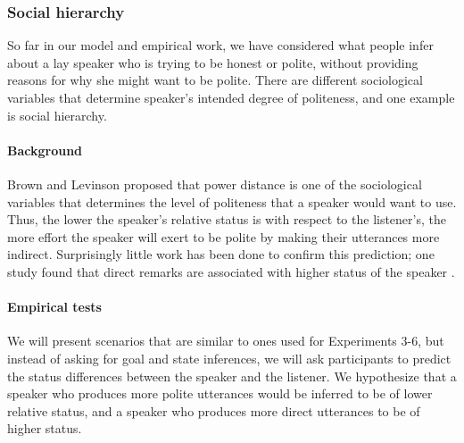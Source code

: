 \subsubsection{Social hierarchy}

So far in our model and empirical work, we have considered what people infer about a lay speaker who is trying to be honest or polite, without providing reasons for why she might want to be polite. There are different sociological variables that determine speaker's intended degree of politeness, and one example is social hierarchy. 

\paragraph{Background} Brown and Levinson proposed that power distance is one of the sociological variables that determines the level of politeness that a speaker would want to use. Thus, the lower the speaker's relative status is with respect to the listener's, the more effort the speaker will exert to be polite by making their utterances more indirect. Surprisingly little work has been done to confirm this prediction; one study found that direct remarks are associated with higher status of the speaker \citep{holtgraves1986}. 

\paragraph{Empirical tests} We will present scenarios that are similar to ones used for Experiments 3-6, but instead of asking for goal and state inferences, we will ask participants to predict the status differences between the speaker and the listener. We hypothesize that a speaker who produces more polite utterances would be inferred to be of lower relative status, and a speaker who produces more direct utterances to be of higher status. 



